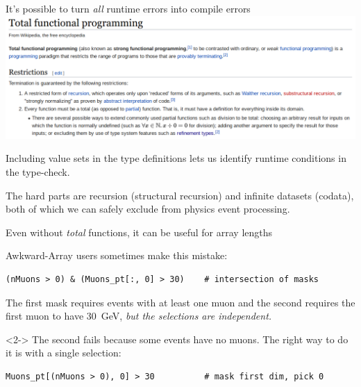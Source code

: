 \documentclass[aspectratio=169]{beamer}
\begin{document}
\begin{frame}{It's possible to turn {\it all} runtime errors into compile errors}
\large
\vspace{0.4 cm}
\includegraphics[width=0.98\linewidth]{totalfunctional-wikipedia.png}

\vspace{0.25 cm}
Including value sets in the type definitions lets us identify runtime conditions in the type-check.

\vspace{0.25 cm}
The hard parts are recursion (structural recursion) and infinite datasets (codata), both of which we can safely exclude from physics event processing.
\end{frame}

\begin{frame}[fragile]{Even without {\it total} functions, it can be useful for array lengths}
\large
\vspace{0.5 cm}

Awkward-Array users sometimes make this mistake:

\small\begin{verbatim}
(nMuons > 0) & (Muons_pt[:, 0] > 30)    # intersection of masks
\end{verbatim}
\large

\vspace{0.25 cm}
The first mask requires events with at least one muon and the second requires the first muon to have 30~GeV, {\it but the selections are independent.}

\vspace{0.5 cm}
\begin{uncoverenv}<2->
The second fails because some events have no muons. The right way to do it is with a single selection:

\small\begin{verbatim}
Muons_pt[(nMuons > 0), 0] > 30          # mask first dim, pick 0
\end{verbatim}
\end{uncoverenv}

\large

\vspace{0.25 cm}
\end{frame}
\end{document}
